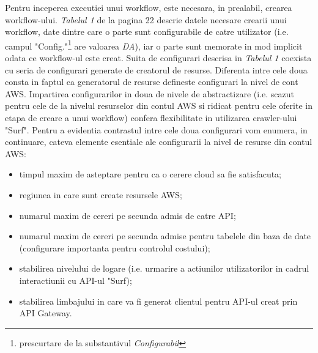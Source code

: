 Pentru inceperea executiei unui workflow, este necesara, in prealabil, crearea workflow-ului. \textit{Tabelul 1} de la pagina 22 descrie datele necesare crearii unui workflow, date dintre care o parte sunt configurabile de catre utilizator (i.e. campul "Config."\footnote{prescurtare de la substantivul \textit{Configurabil}} are valoarea \textit{DA}), iar o parte sunt memorate in mod implicit odata ce workflow-ul este creat. Suita de configurari descrisa in \textit{Tabelul 1} coexista cu seria de configurari generate de creatorul de resurse. Diferenta intre cele doua consta in faptul ca generatorul de resurse defineste configurari la nivel de cont AWS. Impartirea configurarilor in doua de nivele de abstractizare (i.e. scazut pentru cele de la nivelul resurselor din contul AWS si ridicat pentru cele oferite in etapa de creare a unui workflow) confera flexibilitate in utilizarea crawler-ului "Surf". Pentru a evidentia contrastul intre cele doua configurari vom enumera, in continuare, cateva elemente esentiale ale configurarii la nivel de resurse din contul AWS:

\begin{itemize}
	\item{timpul maxim de asteptare pentru ca o cerere cloud sa fie satisfacuta;}
	\item{regiunea in care sunt create resursele AWS;}
	\item{numarul maxim de cereri pe secunda admis de catre API;}
	\item{numarul maxim de cereri pe secunda admise pentru tabelele din baza de date (configurare importanta pentru controlul costului);}
	\item{stabilirea nivelului de logare (i.e. urmarire a actiunilor utilizatorilor in cadrul interactiunii cu API-ul "Surf);}
	\item{stabilirea limbajului in care va fi generat clientul pentru API-ul creat prin API Gateway.}

\end{itemize}

